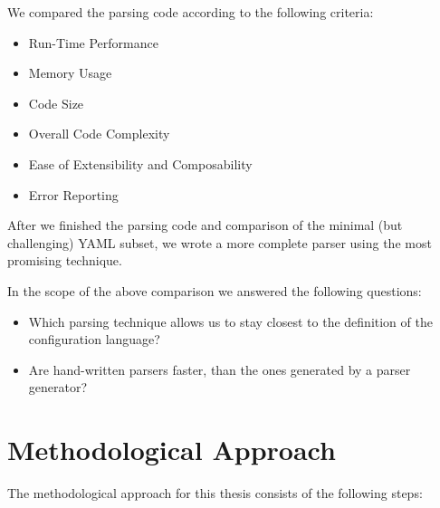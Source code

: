 We compared the parsing code according to the following criteria:

\begin{itemize}
  \item Run-Time Performance
  \item Memory Usage
  \item Code Size
  \item Overall Code Complexity
  \item Ease of Extensibility and Composability
  \item Error Reporting
\end{itemize}

After we finished the parsing code and comparison of the minimal (but challenging) YAML subset, we wrote a more complete  parser using the most promising technique.

In the scope of the above comparison we answered the following questions:

\begin{itemize}[label=❓]

  \item Which parsing technique allows us to stay closest to the definition of the configuration language?

  \item Are hand-written parsers faster, than the ones generated by a parser generator?

\end{itemize}

\section{Methodological Approach}

The methodological approach for this thesis consists of the following steps:


